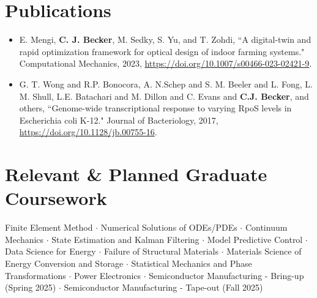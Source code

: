 \documentclass[letterpaper,10.8pt]{article}
\newcommand{\resumeItemNoTitle}[2]{\item\small{\textbf{#1}{ #2 \vspace{-2pt}}}}
\newcommand{\resumeSubItemNoTitle}[2]{\resumeItemNoTitle{#1}{#2}\vspace{-4pt}}
\newcommand{\resumeSubHeadingListStart}{\begin{itemize}[leftmargin=*]}
\newcommand{\resumeSubHeadingListEnd}{\end{itemize}}
\begin{document}
\section{Publications}
\resumeSubHeadingListStart
\resumeSubItemNoTitle{}{E. Mengi, \textbf{C. J. Becker}, M. Sedky, S. Yu, and T. Zohdi, ``A digital-twin and rapid optimization framework for optical design of indoor farming systems." Computational Mechanics, 2023, \url{https://doi.org/10.1007/s00466-023-02421-9}.}
\resumeSubItemNoTitle{}{G. T. Wong and R.P. Bonocora, A. N.Schep and S. M. Beeler and L. Fong, L. M. Shull, L.E. Batachari and M. Dillon and C. Evans and \textbf{C.J. Becker}, and others, ``Genome-wide transcriptional response to varying RpoS levels in Escherichia coli K-12." Journal of Bacteriology, 2017, \url{https://doi.org/10.1128/jb.00755-16}.}
\resumeSubHeadingListEnd

\section{Relevant \& Planned Graduate Coursework}
\small{
Finite Element Method $\cdot$ 
Numerical Solutions of ODEs/PDEs $\cdot$ 
Continuum Mechanics $\cdot$ 
State Estimation and Kalman Filtering  $\cdot$
Model Predictive Control  $\cdot$
Data Science for Energy $\cdot$
Failure of Structural Materials $\cdot$
Materials Science of Energy Conversion and Storage $\cdot$
Statistical Mechanics and Phase Transformations $\cdot$
Power Electronics $\cdot$
Semiconductor Manufacturing - Bring-up (Spring 2025) $\cdot$
Semiconductor Manufacturing - Tape-out (Fall 2025)
}

\end{document}
